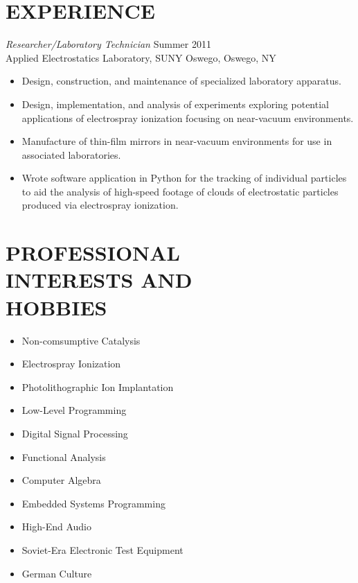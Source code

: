 \documentclass[line,margin]{res}
\begin{document}
\begin{resume}
\section{EXPERIENCE} {\sl Researcher/Laboratory Technician} \hfill Summer 2011 \\
                Applied Electrostatics Laboratory, 
                SUNY Oswego, Oswego, NY
                 \begin{itemize}  \itemsep -2pt %
                \item   Design, construction, and maintenance of 
				        specialized laboratory apparatus.
                \item   Design, implementation, and analysis of
				        experiments exploring potential applications
						of electrospray ionization focusing
						on near-vacuum environments.
				\item   Manufacture of thin-film mirrors in
				        near-vacuum environments for use in
						associated laboratories.
				\item   Wrote software application in Python
						for the tracking of individual particles
						to aid the analysis of high-speed footage
						of clouds of electrostatic particles
						produced via electrospray ionization.
                \end{itemize}

\section{PROFESSIONAL \\ INTERESTS AND \\ HOBBIES}
				\begin{itemize} \itemsep -2pt
				\item	Non-comsumptive Catalysis
				\item	Electrospray Ionization
				\item	Photolithographic Ion Implantation
				\item	Low-Level Programming
				\item	Digital Signal Processing
				\item	Functional Analysis
				\item	Computer Algebra
				\item	Embedded Systems Programming
				\item	High-End Audio
				\item	Soviet-Era Electronic Test Equipment
				\item	German Culture
				\end{itemize}


\end{resume}
\end{document}
